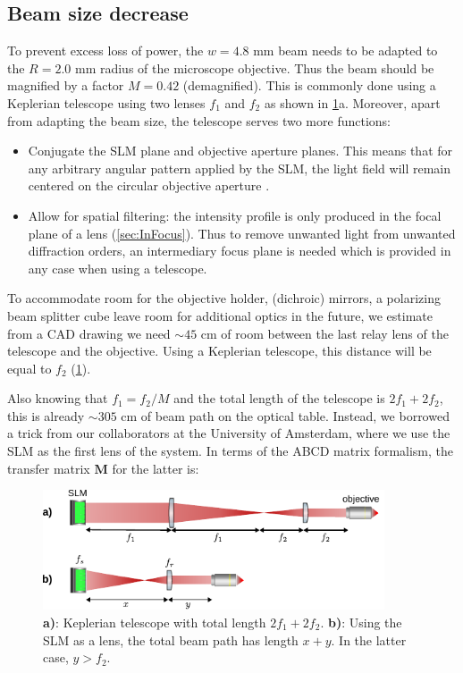 \subsection{Beam size decrease}

To prevent excess loss of power, the $w = 4.8$ mm beam needs to be adapted to the $R = 2.0$ mm radius of the microscope objective. 
Thus the beam should be magnified by a factor $M=0.42$ (demagnified).
This is commonly done using a Keplerian telescope using two lenses $f_1$ and $f_2$ as shown in \ref{fig:SLMbeampath}a.
Moreover, apart from adapting the beam size, the telescope serves two more functions:

\begin{itemize}
    \item Conjugate the SLM plane and objective aperture planes.
    This means that for any arbitrary angular pattern applied by the SLM, the light field will remain centered on the circular objective aperture \cite{Nogrette2014}. 
    
    \item Allow for spatial filtering: the intensity profile is only produced in the focal plane of a lens (\cref{sec:InFocus}).
    Thus to remove unwanted light from unwanted diffraction orders, an intermediary focus plane is needed which is provided in any case when using a telescope.
\end{itemize}
To accommodate room for the objective holder, (dichroic) mirrors, a polarizing beam splitter cube leave room for additional optics in the future, we estimate from a CAD drawing we need $\sim 45$ cm of room between the last relay lens of the telescope and the objective. 
Using a Keplerian telescope, this distance will be equal to $f_2$ (\cref{fig:SLMbeampath}).

Also knowing that $f_1=f_2/M$ and the total length of the telescope is $2f_1+2f_2$, this is already $\sim 305$ cm of beam path on the optical table. 
Instead, we borrowed a trick from our collaborators at the University of Amsterdam, where we use the SLM as the first lens of the system. 
In terms of the ABCD matrix formalism, the transfer matrix $\mathbf{M}$ for the latter is:

\begin{figure}
	\centering
	\includegraphics[width=0.9\textwidth]{figures/beampathSLM.pdf}
	\caption{\textbf{a)}: Keplerian telescope with total length $2f_1+2f_2$. \textbf{b)}: Using the SLM as a lens, the total beam path has length $x+y$. In the latter case, $y>f_2$.}
	\label{fig:SLMbeampath}
\end{figure}

